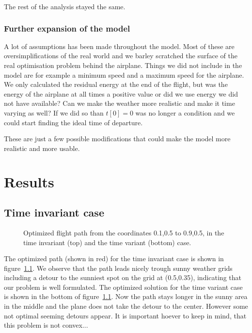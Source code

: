 \documentclass[ twoside,openright,titlepage,numbers=noenddot,headinclude,%
                footinclude=true,cleardoublepage=empty,abstractoff, %
                BCOR=5mm,paper=a4,fontsize=11pt,%
                ngerman,american,%
                ]{scrreprt}
\begin{document}
The rest of the analysis stayed the same.


\subsection{Further expansion of the model}

A lot of assumptions has been made throughout the model.
Most of these are oversimplifications of the real world and we barley scratched the surface of the real optimisation problem behind the airplane.
Things we did not include in the model are for example a minimum speed and a maximum speed for the airplane.
We only calculated the residual energy at the end of the flight, but was the energy of the airplane at all times a positive value or did we use energy we did not have available?
Can we make the weather more realistic and make it time varying as well? If we did so than $ t[0] =0 $ was no longer a condition and we could start finding the ideal time of departure.

These are just a few possible modifications that could make the model more realistic and more usable.






\chapter{Results}
\section{Time invariant case}
\begin{figure}

%
\caption{Optimized flight path from the coordinates 0.1,0.5 to 0.9,0.5, in the time invariant (top) and the time variant (bottom) case.}
\label{fig:path}
\end{figure}
The optimized path (shown in red) for the time invariant case is shown in figure~\ref{fig:path}. We observe that the path leads nicely trough sunny weather grids including a detour to the sunniest spot on the grid at (0.5,0.35), indicating that our problem is well formulated. The optimized solution for the time variant case is shown in the bottom of figure~\ref{fig:path}. Now the path stays longer in the sunny area in the middle and the plane does not take the detour to the center. However some not optimal seeming detours appear. It is important hoever to keep in mind, that this problem is not convex... 
\end{document}
